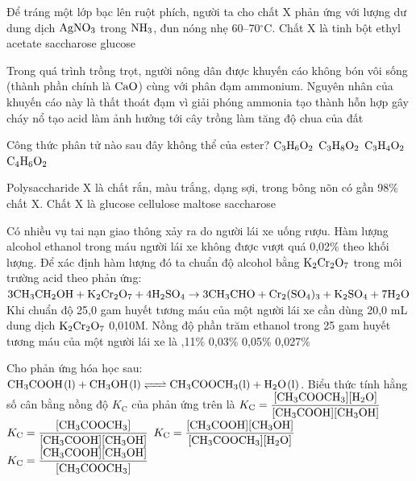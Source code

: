 \documentclass[11pt,a4paper]{article}
\begin{document}
\begin{ex}
Để tráng một lớp bạc lên ruột phích, người ta cho chất X phản ứng với lượng dư dung dịch $\ce{AgNO3}$ trong $\ce{NH3}$, đun nóng nhẹ 60--70$^\circ\text{C}$. Chất X là
\choice
{tinh bột}
{ethyl acetate}
{saccharose}
{\True glucose}
\end{ex}
\begin{ex}
Trong quá trình trồng trọt, người nông dân được khuyến cáo không bón vôi sống (thành phần chính là $\ce{CaO}$) cùng với phân đạm ammonium. Nguyên nhân của khuyến cáo này là
\choice
{\True thất thoát đạm vì giải phóng ammonia}
{tạo thành hỗn hợp gây cháy nổ}
{tạo acid làm ảnh hưởng tới cây trồng}
{làm tăng độ chua của đất}
\end{ex}
\begin{ex}
Công thức phân tử nào sau đây không thể của ester?
\choice
{$\ce{C3H6O2}$}
{\True $\ce{C3H8O2}$}
{$\ce{C3H4O2}$}
{$\ce{C4H6O2}$}
\end{ex}
\begin{ex}
Polysaccharide X là chất rắn, màu trắng, dạng sợi, trong bông nõn có gần 98\% chất X. Chất X là
\choice
{glucose}
{\True cellulose}
{maltose}
{saccharose}
\end{ex}
\begin{ex}
Có nhiều vụ tai nạn giao thông xảy ra do người lái xe uống rượu. Hàm lượng alcohol ethanol trong máu người lái xe không được vượt quá 0,02\% theo khối lượng. Để xác định hàm lượng đó ta chuẩn độ alcohol bằng $\ce{K2Cr2O7}$ trong môi trường acid theo phản ứng:\\
$3\ce{CH3CH2OH} + \ce{K2Cr2O7} + 4\ce{H2SO4} \rightarrow 3\ce{CH3CHO} + \ce{Cr2(SO4)3} + \ce{K2SO4} + 7\ce{H2O}$\\
Khi chuẩn độ 25,0 gam huyết tương máu của một người lái xe cần dùng 20,0 mL dung dịch $\ce{K2Cr2O7}$ 0,010M. Nồng độ phần trăm ethanol trong 25 gam huyết tương máu của một người lái xe là
\choice
{,11\%}
{0,03\%}
{0,05\%}
{0,027\%}
\end{ex}
\begin{ex}
Cho phản ứng hóa học sau: $\ce{CH3COOH(l) + CH3OH(l) <=> CH3COOCH3(l) + H2O(l)}$. Biểu thức tính hằng số cân bằng nồng độ $K_{\text{C}}$ của phản ứng trên là
\choice
{\True $K_{\text{C}} = \dfrac{[\ce{CH3COOCH3}][\ce{H2O}]}{[\ce{CH3COOH}][\ce{CH3OH}]}$}
{$K_{\text{C}} = \dfrac{[\ce{CH3COOCH3}]}{[\ce{CH3COOH}][\ce{CH3OH}]}$}
{$K_{\text{C}} = \dfrac{[\ce{CH3COOH}][\ce{CH3OH}]}{[\ce{CH3COOCH3}][\ce{H2O}]}$}
{$K_{\text{C}} = \dfrac{[\ce{CH3COOH}][\ce{CH3OH}]}{[\ce{CH3COOCH3}]}$}
\end{ex}
\end{document}
